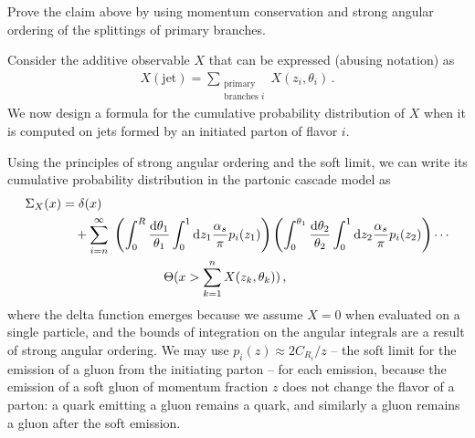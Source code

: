 \begin{exercise}
    Prove the claim above by using momentum conservation and strong angular ordering of the splittings of primary branches.
\end{exercise}



\begin{example}
    \label{ex:dyson-substructure}
    Consider the additive observable \(X\) that can be expressed (abusing notation) as
    \begin{align}
        X(\text{jet})
        =
        \sum_{\substack{\text{primary}\\\text{branches } i}}
        X(z_i, \theta_i)
        \,.
    \end{align}
    We now design a formula for the cumulative probability distribution of \(X\) when it is computed on jets formed by an initiated parton of flavor \(i\).

    Using the principles of strong angular ordering and the soft limit, we can write its cumulative probability distribution in the partonic cascade model as
    \begin{align}
        \label{eq:general-additive-cumulative-distribution}
        \Sigma_X(x)
        &=
        \delta(x)
        \\
        \notag
        &\quad
        +
        \sum_{i = n}^\infty
        \,\,
        \le(
        \int_0^R \frac{\dd\theta_1}{\theta_1}
        \int_0^1 \dd z_1
        \frac{\alpha_s}{\pi}
        p_i(z_1)
        \ri)
        \le(
        \int_0^{\theta_1} \frac{\dd\theta_2}{\theta_2}
        \int_0^1 \dd z_2
        \frac{\alpha_s}{\pi}
        p_i(z_2)
        \ri)
        \cdots
        \\
        &\qquad\qquad\qquad\qquad
        \Theta(x > \sum_{k = 1}^n X(z_k, \theta_k))
        \,,
    \end{align}
    where the delta function emerges because we assume \(X = 0\) when evaluated on a single particle, and the bounds of integration on the angular integrals are a result of strong angular ordering.
    We may use \(p_i(z) \approx 2 C_{R_i} / z\) -- the soft limit for the emission of a gluon from the initiating parton -- for each emission, because the emission of a soft gluon of momentum fraction \(z\) does not change the flavor of a parton:
    a quark emitting a gluon remains a quark, and similarly a gluon remains a gluon after the soft emission.


\end{example}
